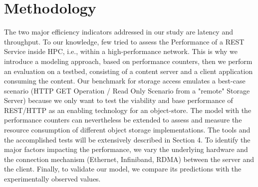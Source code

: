 \documentclass[runningheads]{llncs}
\begin{document}
\section {Methodology} \label{sec:methodology}
The two major efficiency indicators addressed in our study are latency and throughput.
To our knowledge, few tried to assess the Performance of a REST Service inside HPC, i.e., within a high-performance network. This is why we introduce a modeling approach, based on performance counters, then we perform an evaluation on a testbed, consisting of a content server and a client application consuming the content. Our benchmark for storage access emulates a best-case scenario (HTTP GET Operation / Read Only Scenario from a "remote" Storage Server) because we only want to test the viability and base performance of REST/HTTP as an enabling technology for an object-store. The model with the performance counters can nevertheless be extended to assess and measure the resource consumption of different object storage implementations. The tools and the accomplished tests will be extensively described in Section 4. To identify the major factors impacting the performance, we vary the underlying hardware and the connection mechanism (Ethernet, Infiniband, RDMA) between the server and the client. Finally, to validate our model, we compare its predictions with the experimentally observed values.
\end{document}
